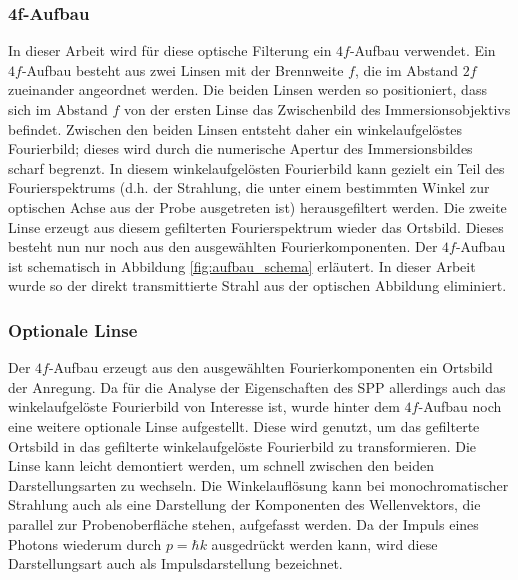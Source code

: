 \documentclass[a4paper, titlepage,  ngerman]{book}
\begin{document}
	\subsubsection{4f-Aufbau}
	In dieser Arbeit wird für diese optische Filterung ein $4f$-Aufbau verwendet. Ein $4f$-Aufbau besteht aus zwei Linsen mit der Brennweite $f$, die im Abstand $2f$ zueinander angeordnet werden. Die beiden Linsen werden so positioniert, dass sich im Abstand $f$ von der ersten Linse das Zwischenbild des Immersionsobjektivs befindet. Zwischen den beiden Linsen entsteht daher ein winkelaufgelöstes Fourierbild; dieses wird durch die numerische Apertur des Immersionsbildes scharf begrenzt.  In diesem winkelaufgelösten Fourierbild kann gezielt ein Teil des Fourierspektrums (d.h. der Strahlung, die unter einem bestimmten Winkel zur optischen Achse aus der Probe ausgetreten ist) herausgefiltert werden. Die zweite Linse erzeugt aus diesem gefilterten Fourierspektrum wieder das Ortsbild. Dieses besteht nun nur noch aus den ausgewählten Fourierkomponenten. Der $4f$-Aufbau ist schematisch in Abbildung \ref{fig:aufbau_schema} erläutert. In dieser Arbeit wurde so der direkt transmittierte Strahl aus der optischen Abbildung eliminiert.
	\subsubsection{Optionale Linse}
	Der $4f$-Aufbau erzeugt aus den ausgewählten Fourierkomponenten ein Ortsbild der Anregung. Da für die Analyse der Eigenschaften des SPP allerdings auch das winkelaufgelöste Fourierbild von Interesse ist, wurde hinter dem $4f$-Aufbau noch eine weitere optionale Linse aufgestellt. Diese wird genutzt, um das gefilterte Ortsbild in das gefilterte winkelaufgelöste Fourierbild zu transformieren. Die Linse kann leicht demontiert werden, um schnell zwischen den beiden Darstellungsarten zu wechseln. Die Winkelauflösung kann bei monochromatischer Strahlung auch als eine Darstellung der Komponenten des Wellenvektors, die parallel zur Probenoberfläche stehen, aufgefasst werden. Da der Impuls eines Photons wiederum durch $p = \hbar k$ ausgedrückt werden kann, wird diese Darstellungsart auch als Impulsdarstellung bezeichnet.
	
\end{document}

